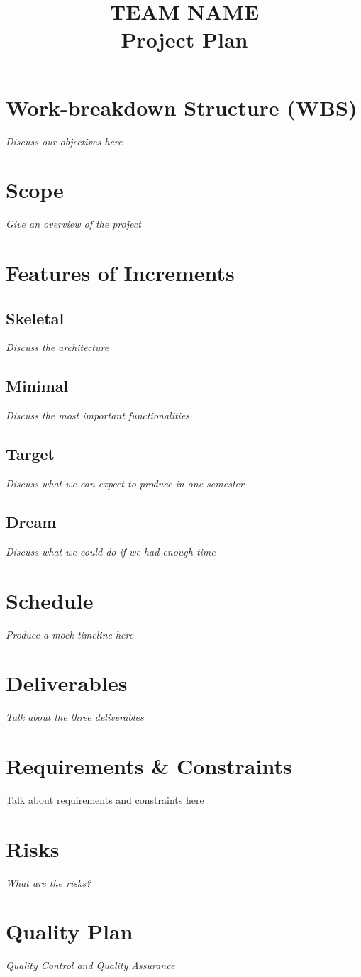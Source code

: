 \documentclass[10pt,a4paper]{article}
\begin{document}
 
\title{TEAM NAME \\
\large Project Plan}
\date{}
\maketitle

\section*{Work-breakdown Structure (WBS)}
\textit{Discuss our objectives here}

\section*{Scope}
\textit{Give an overview of the project}

\section*{Features of Increments}
\subsection*{Skeletal}
\textit{Discuss the architecture}

\subsection*{Minimal}
\textit{Discuss the most important functionalities}

\subsection*{Target}
\textit{Discuss what we can expect to produce in one semester}

\subsection*{Dream}
\textit{Discuss what we could do if we had enough time}


\section*{Schedule}
\textit{Produce a mock timeline here}

\section*{Deliverables}
\textit{Talk about the three deliverables}

\section*{Requirements \& Constraints}
Talk about requirements and constraints here

\section*{Risks}
\textit{What are the risks?}

\section*{Quality Plan}
\textit{Quality Control and Quality Assurance}
\end{document}
